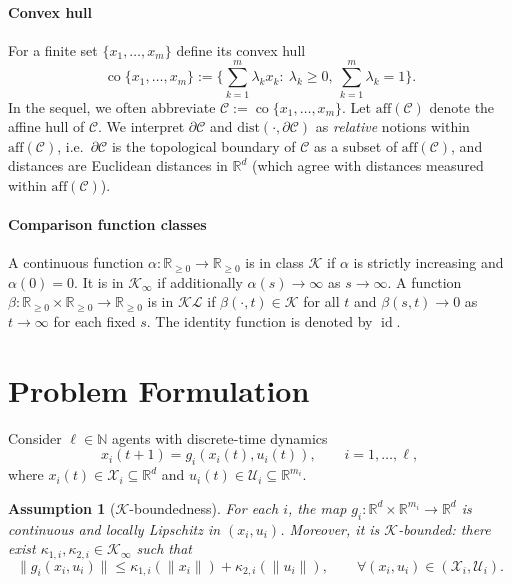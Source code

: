 \documentclass[12pt,draftcls,onecolumn]{IEEEtran}
\newtheorem{assumption}{Assumption}
\newcommand{\X}{\ensuremath{\mathcal X}}
\newcommand{\U}{\ensuremath{\mathcal U}}
\def\K{\mathcal{K}}%
\DeclareMathOperator{\id}{id}
\def\C{\mathcal{C}}
\begin{document}
\paragraph{Convex hull}
For a finite set $\{x_1,\dots,x_m\}$ define its convex hull
\[
\operatorname{co}\{x_1,\dots,x_m\}:=\Big\{\sum_{k=1}^m\lambda_k x_k:\ \lambda_k\ge 0,\ \sum_{k=1}^m\lambda_k=1\Big\}.
\]
In the sequel, we often abbreviate $\C := \operatorname{co}\{x_1,\dots,x_m\}$.
Let $\mathrm{aff}(\C)$ denote the affine hull of $\C$. We interpret $\partial \C$ and $\mathrm{dist}(\cdot,\partial \C)$
as \emph{relative} notions within $\mathrm{aff}(\C)$, i.e.\ $\partial \C$ is the topological boundary of $\C$ as a subset of $\mathrm{aff}(\C)$, and distances are Euclidean distances in $\mathbb R^d$
(which agree with distances measured within $\mathrm{aff}(\C)$).

\paragraph{Comparison function classes}
A continuous function $\alpha:\mathbb{R}_{\ge 0}\to\mathbb{R}_{\ge 0}$ is in class $\mathcal{K}$
if $\alpha$ is strictly increasing and $\alpha(0)=0$. It is in $\mathcal{K}_\infty$ if additionally $\alpha(s)\to\infty$ as $s\to\infty$.
A function $\beta:\mathbb{R}_{\ge 0}\times\mathbb{R}_{\ge 0}\to\mathbb{R}_{\ge 0}$ is in $\mathcal{KL}$ if
$\beta(\cdot,t)\in\mathcal{K}$ for all $t$ and $\beta(s,t)\to 0$ as $t\to\infty$ for each fixed $s$.
The identity function is denoted by $\id$.

\section{Problem Formulation}\label{sec:problem-formulation}

Consider $\ell\in\mathbb{N}$ agents with discrete-time dynamics
\begin{equation}\label{eq:agent_dyn}
x_i(t+1)=g_i(x_i(t),u_i(t)),\qquad i=1,\dots,\ell,
\end{equation}
where $x_i(t)\in \X_i\subseteq\mathbb{R}^d$ and $u_i(t)\in \U_i\subseteq\mathbb{R}^{m_i}$.

\begin{assumption}[$\K$-boundedness]\label{ass:K-boundedness}
For each $i$, the map $g_i:\mathbb{R}^d\times\mathbb{R}^{m_i}\to\mathbb{R}^d$ is continuous and locally Lipschitz in $(x_i,u_i)$.
Moreover, it is $\K$-bounded: there exist $\kappa_{1,i},\kappa_{2,i}\in\K_\infty$ such that
\[
\|g_i(x_i,u_i)\|\le \kappa_{1,i}(\|x_i\|)+\kappa_{2,i}(\|u_i\|),\qquad \forall (x_i,u_i) \in ( \X_i, \U_i ).
\]
\end{assumption}
\end{document}
